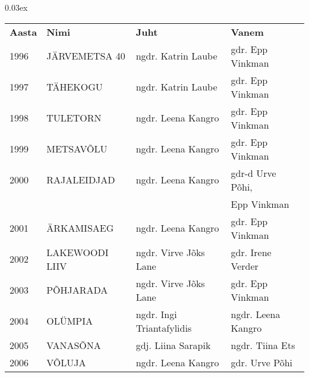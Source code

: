\documentclass[12pt]{extbook}
\begin{document}
{\centering\scriptsize\arrayrulewidth 0.03ex
\begin{tabular*}{1.0\textwidth}{@{\extracolsep{\fill}}@{}l@{}@{}l@{}@{}l@{}@{}l@{}}
\bf{Aasta}	&	\bf{Nimi}				&	\bf{Juht}				&	\bf{Vanem}\\[2mm]
	1996	&	J\"ARVEMETSA 40			&	ngdr. Katrin Laube		&	gdr. Epp Vinkman\\[2mm]
	1997	&	T\"AHEKOGU				&	ngdr. Katrin Laube		&	gdr. Epp Vinkman\\[2mm]
	1998	&	TULETORN				&	ngdr. Leena Kangro		&	gdr. Epp Vinkman\\[2mm]
	1999	&	METSAV\~OLU				&	ngdr. Leena Kangro		&	gdr. Epp Vinkman\\[2mm]
	2000	&	RAJALEIDJAD				&	ngdr. Leena Kangro		&	gdr-d  Urve P\~ohi,\\
			&							&							&	Epp Vinkman\\[2mm]
	2001	&	\"ARKAMISAEG			&	ngdr. Leena Kangro		&	gdr. Epp Vinkman\\[2mm]
	2002	&	LAKEWOODI LIIV			&	ngdr. Virve J\~oks Lane	&	gdr. Irene Verder\\[2mm]
	2003	&	P\~OHJARADA				&	ngdr. Virve J\~oks Lane	&	gdr. Epp Vinkman\\[2mm]
	2004	&	OL\"UMPIA				&	ngdr. Ingi Triantafylidis&	ngdr. Leena Kangro\\[2mm]
	2005	&	VANAS\~ONA				&	gdj. Liina Sarapik		&	ngdr. Tiina Ets\\[2mm]
	2006	&	V\~OLUJA				&	ngdr. Leena Kangro		&	gdr. Urve P\~ohi\\[2mm]
\end{tabular*}}

\clearpage
\end{document}
